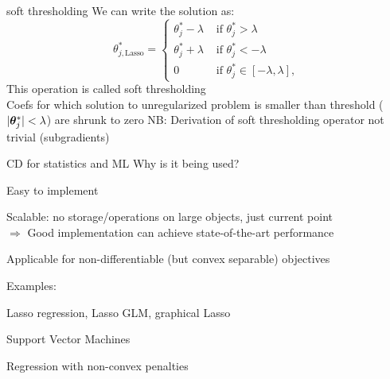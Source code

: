 \documentclass[11pt,compress,t,notes=noshow, xcolor=table]{beamer}
\begin{document}
\begin{frame2}{soft thresholding}
We can write the solution as: 
$$\theta^\ast_{j, \text{Lasso}} =
\begin{cases}
\theta^\ast_j - \lambda & \text{ if } \theta^\ast_j > \lambda \\
\theta^\ast_j + \lambda & \text{ if } \theta^\ast_j < - \lambda \\
0 &  \text{ if }  \theta^\ast_j \in [- \lambda, \lambda],
\end{cases}$$
This operation is called soft thresholding\\
\lz
Coefs for which solution to unregularized problem is smaller than threshold ($|\bm{\theta}^\ast_j| < \lambda$) are shrunk to zero
\lz
NB: Derivation of soft thresholding operator not trivial (subgradients)
\end{frame2}


\begin{frame2}{CD for statistics and ML}
Why is it being used?
\begin{itemizeL}
\item Easy to implement
\item Scalable: no storage/operations on large objects,
just current point \\
$\Rightarrow$ Good implementation can achieve state-of-the-art performance
\item Applicable for non-differentiable (but convex separable) objectives
\end{itemizeL}
\lz
Examples:
\begin{itemizeL}
\item Lasso regression, Lasso GLM, graphical Lasso
\item Support Vector Machines
\item Regression with non-convex penalties
\end{itemizeL}
\end{frame2}

\endlecture
\end{document}
